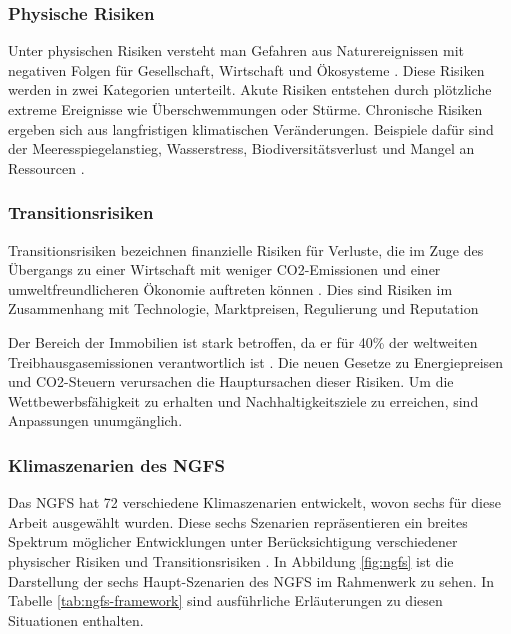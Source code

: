 \subsubsection{Physische Risiken}
Unter physischen Risiken versteht man Gefahren aus Naturereignissen mit negativen Folgen für Gesellschaft, Wirtschaft und Ökosysteme \parencite{greenvisionsolutions_transitorische_2024}. Diese Risiken werden in zwei Kategorien unterteilt. Akute Risiken entstehen durch plötzliche extreme Ereignisse wie Überschwemmungen oder Stürme. Chronische Risiken ergeben sich aus langfristigen klimatischen Veränderungen. Beispiele dafür sind der Meeresspiegelanstieg, Wasserstress, Biodiversitätsverlust und Mangel an Ressourcen \parencite{dnb2019values}.
\subsubsection{Transitionsrisiken}
Transitionsrisiken bezeichnen finanzielle Risiken für Verluste, die im Zuge des Übergangs zu einer Wirtschaft mit weniger CO2-Emissionen und einer umweltfreundlicheren Ökonomie auftreten können \parencite{ecb2020climate}. Dies sind Risiken im Zusammenhang mit Technologie, Marktpreisen, Regulierung und Reputation

Der Bereich der Immobilien ist stark betroffen, da er für 40\% der weltweiten Treibhausgasemissionen verantwortlich ist \parencite{unepfi2023realestate}. Die neuen Gesetze zu Energiepreisen und CO2-Steuern verursachen die Hauptursachen dieser Risiken. Um die Wettbewerbsfähigkeit zu erhalten und Nachhaltigkeitsziele zu erreichen, sind Anpassungen unumgänglich.


\subsubsection{Klimaszenarien des NGFS}\label{sec:ngfs}
Das \ac{NGFS} hat 72 verschiedene Klimaszenarien entwickelt, wovon sechs für diese Arbeit ausgewählt wurden. Diese sechs Szenarien repräsentieren ein breites Spektrum möglicher Entwicklungen unter Berücksichtigung verschiedener physischer Risiken und Transitionsrisiken \parencite{NGFS2021}. In Abbildung \ref{fig:ngfs} ist die Darstellung der sechs Haupt-Szenarien des NGFS im Rahmenwerk zu sehen. In Tabelle \ref{tab:ngfs-framework} sind ausführliche Erläuterungen zu diesen Situationen enthalten.

